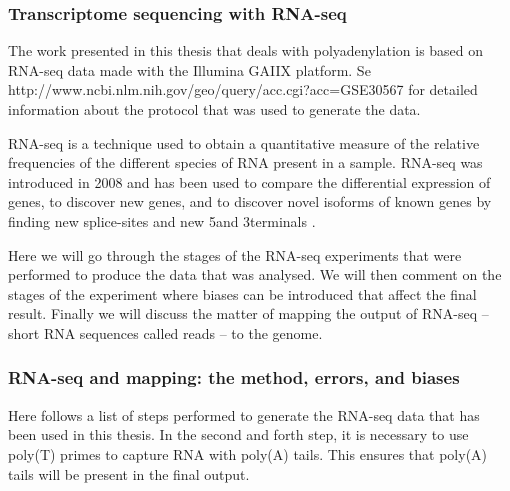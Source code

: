 %
\subsubsection{Transcriptome sequencing with RNA-seq}
The work presented in this thesis that deals with polyadenylation is based on
RNA-seq data made with the Illumina GAIIX platform. Se
http://www.ncbi.nlm.nih.gov/geo/query/acc.cgi?acc=GSE30567 for detailed
information about the protocol that was used to generate the data.

RNA-seq is a technique used to obtain a quantitative measure of the relative
frequencies of the different species of RNA present in a sample. RNA-seq was
introduced in 2008 \cite{nagalakshmi_transcriptional_2008} and has been used
to compare the differential expression of genes, to discover new genes, and to
discover novel isoforms of known genes by finding new splice-sites and new
5\ppp and 3\ppp terminals \cite{wang_rna-seq:_2009}.

Here we will go through the stages of the RNA-seq experiments that were
performed to produce the data that was analysed. We will then comment on the
stages of the experiment where biases can be introduced that affect the final
result. Finally we will discuss the matter of mapping the output of RNA-seq --
short RNA sequences called reads -- to the genome.

\subsubsection{RNA-seq and mapping: the method, errors, and biases}

Here follows a list of steps performed to generate the RNA-seq data that has
been used in this thesis. In the second and forth step, it is necessary to use
poly(T) primes to capture RNA with poly(A) tails. This ensures that poly(A)
tails will be present in the final output.

